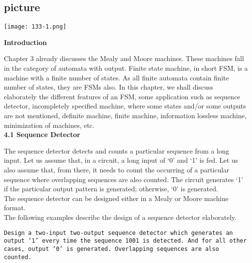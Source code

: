 \documentclass{article}
\begin{document}
\begin{center}
\section{picture}
\texttt{[image: 133-1.png]}
\end{center}

\large{
\textbf{Introduction}\\
}

Chapter 3 already discusses the Mealy and Moore machines. These machines fall in the category of
automata with output. Finite state machine, in short FSM, is a machine with a finite number of states. As
all finite automata contain finite number of states, they are FSMs also. In this chapter, we shall discuss
elaborately the different features of an FSM, some application such as sequence detector, incompletely
specified machine, where some states and/or some outputs are not mentioned, definite machine, finite
machine, information lossless machine, minimization of machines, etc.\\

\vspace*{0.5cm}
\large{
\textbf{4.1 Sequence Detector}
}

The sequence detector detects and counts a particular sequence from a long input. Let us assume that,
in a circuit, a long input of ‘0’ and ‘1’ is fed. Let us also assume that, from there, it needs to count the
occurring of a particular sequence where overlapping sequences are also counted. The circuit generates
‘1’ if the particular output pattern is generated; otherwise, ‘0’ is generated.\\
\hspace*{0.5cm} The sequence detector can be designed either in a Mealy or Moore machine format.\\
\hspace*{0.5cm} The following examples describe the design of a sequence detector elaborately.\\

\vspace*{0.5cm}

\hspace*{0.1cm} \texttt{Design a two-input two-output sequence detector which generates an output ‘1’ every
time the sequence 1001 is detected. And for all other cases, output ‘0’ is generated.
Overlapping sequences are also counted.}\\
\end{document}
